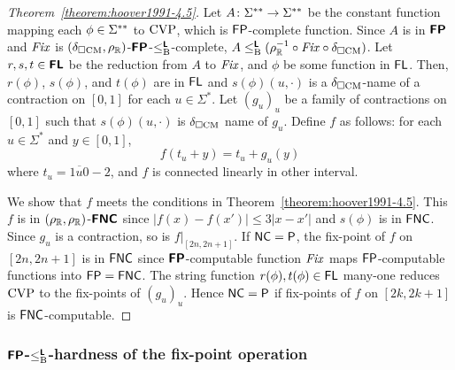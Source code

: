 \documentclass[envcountsect,envcountsame,orivec,oribibl]{llncs}
\begin{document}
\begin{proof}
[Theorem~\ref{theorem:hoover1991-4.5}]
 Let $A \colon \Sigma ^{**} \to \Sigma ^{**}$ be the constant function mapping each $\phi \in \Sigma ^{**}$ to $\mathrm{CVP}$, which is $\mathsf{FP}$-complete function.
 Since  $A$ is in $\text{\bfseries \sffamily \upshape FP}$ and $\mathit{Fix}$ is $(\delta _{\square \mathrm{CM}}, \rho _\mathbb R)$-$\text{\bfseries \sffamily \upshape FP}$-$\leq _{\mathrm B} ^{\text{\bfseries \sffamily \upshape L}}$-complete, $A \leq _{\mathrm B} ^{\text{\bfseries \sffamily \upshape L}} (\rho _\mathbb R^{-1} \circ \mathit{Fix} \circ \delta _{\square \mathrm{CM}})$.
 Let $r,s,t \in \text{\bfseries \sffamily \upshape FL}$ be the reduction from $A$ to $\mathit{Fix}$,
 and $\phi$ be some function in $\mathsf{FL}$.
 Then, $r(\phi)$, $s(\phi)$, and $t(\phi)$ are in $\mathsf{FL}$ and
 $s(\phi)(u, \cdot)$ is a $\delta _{\square \mathrm{CM}}$-name of a contraction on $[0,1]$ 
 for each $u \in \Sigma^*$.
 Let $(g_u)_u$ be a family of contractions on $[0,1]$
 such that $s(\phi)(u, \cdot)$ is $\delta _{\square \mathrm{CM}}$ name of $g_u$.
 Define $f$ as follows: for each $u \in \Sigma^*$ and $y \in [0, 1]$,
 \begin{equation}
  \label{eq:def-f}
 f(t_u + y) = t_u + g_u(y)
 \end{equation}
 where $t_u = \overline{1u0}-2$, 
 and $f$ is connected linearly in other interval.

 We show that $f$ meets the conditions in Theorem~\ref{theorem:hoover1991-4.5}.
 This $f$ is in $(\rho _\mathbb R, \rho _\mathbb R)$-$\text{\bfseries \sffamily \upshape FNC}$ since 
 $|f(x) - f(x')| \le 3|x-x'|$ and $s(\phi)$ is in $\mathsf{FNC}$.
 Since $g_u$ is a contraction, so is $f|_{[2n, 2n+1]}$.
 If $\mathsf{NC} = \mathsf{P}$,
 the fix-point of $f$ on $[2n, 2n+1]$ 
 is in $\mathsf{FNC}$ since $\text{\bfseries \sffamily \upshape FP}$-computable function 
 $\mathit{Fix}$ maps $\mathsf{FP}$-computable functions into $\mathsf{FP} = \mathsf{FNC}$.
 The string function $r(\phi), t(\phi) \in \mathsf{FL}$ many-one reduces
 $\mathrm{CVP}$ to the fix-points of $(g_u)_u$.
 Hence $\mathsf{NC} = \mathsf{P}$ if fix-points of $f$ on $[2k, 2k+1]$ is $\mathsf{FNC}$-computable.
\end{proof}

\subsubsection{$\text{\bfseries \sffamily \upshape FP}$-$\leq _{\mathrm B} ^{\text{\bfseries \sffamily \upshape L}}$-hardness of the fix-point operation}
\end{document}
